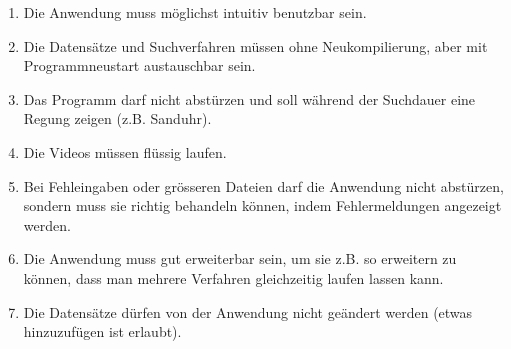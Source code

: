 \begin{enumerate}[label=\bfseries /NF \arabic*0/]
  \item Die Anwendung muss möglichst intuitiv benutzbar sein.
  \item Die Datensätze und Suchverfahren müssen ohne Neukompilierung, aber mit Programmneustart austauschbar sein.
  \item Das Programm darf nicht abstürzen und soll während der Suchdauer eine Regung zeigen (z.B. Sanduhr).
  \item Die Videos müssen flüssig laufen.
  \item Bei Fehleingaben oder grösseren Dateien darf die Anwendung nicht abstürzen, sondern muss sie richtig behandeln können, indem Fehlermeldungen angezeigt werden.
  \item Die Anwendung muss gut erweiterbar sein, um sie z.B. so erweitern zu können, dass man mehrere Verfahren gleichzeitig laufen lassen kann.
  \item Die Datensätze dürfen von der Anwendung nicht geändert werden (etwas hinzuzufügen ist erlaubt).
\end{enumerate}
